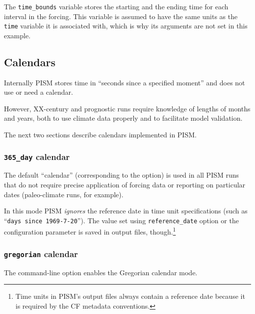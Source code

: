 \documentclass[titlepage,letterpaper,final]{scrartcl}
\begin{document}
The \texttt{time_bounds} variable stores the starting and the ending time for
each interval in the forcing. This variable is assumed to have the same units
as the \texttt{time} variable it is associated with, which is why its arguments
are not set in this example.

\subsection{Calendars}
\label{sec:calendars}

Internally PISM stores time in ``seconds since a specified moment'' and
does not use or need a calendar.

However, XX-century and prognostic runs require knowledge of lengths of months
and years, both to use climate data properly and to facilitate model validation.

The next two sections describe calendars implemented in PISM.

\subsubsection{\texttt{365_day} calendar}
\label{sec:365-day}

The default ``calendar'' (corresponding to the  option) is used in all PISM runs that do not require precise application of forcing data or reporting on particular dates (paleo-climate runs, for example).

In this mode PISM \emph{ignores} the reference date in time unit specifications
(such as ``\texttt{days since 1969-7-20}''). The value set using
\texttt{reference_date} option or the configuration parameter is saved in
output files, though.\footnote{Time units in PISM's output files always contain a reference date because it is required by the CF metadata conventions.}

\subsubsection{\texttt{gregorian} calendar}
\label{sec:gregorian}

The command-line option  enables the Gregorian
calendar mode.
\end{document}
